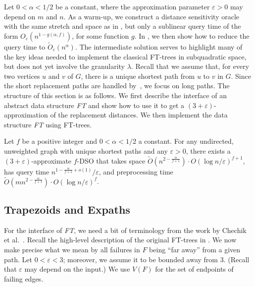 \documentclass{theoretics}
\newcommand*{\Otilde}{\widetilde{O}}
\newcommand{\eps}{\varepsilon}
\begin{document}
Let $0 < \alpha < 1/2$ be a constant,
where the approximation parameter $\varepsilon > 0$ may depend on $m$ and $n$.
As a warm-up, we construct a
distance sensitivity oracle with the same stretch and space as in ,
but only a sublinear query time of the form $O_{\varepsilon}(n^{1-g(\alpha,f)})$,
for some function $g$.
In , we then show how to reduce the query time to $\Otilde_\eps(n^\alpha)$.
The intermediate solution serves to highlight many of the key ideas 
needed to implement the classical FT-trees in subquadratic space,
but does not yet involve the granularity $\lambda$. 
Recall that we assume that, for every two vertices $u$ and $v$ of $G$,
there is a unique shortest path from $u$ to $v$ in $G$.
Since the short replacement paths are handled by~,
we focus on long paths.
The structure of this section is as follows.
We first describe the interface of an abstract data structure \emph{FT}
and show how to use it to get a $(3{+}\eps)$-approximation of the replacement distances.
We then implement the data structure \emph{FT} using FT-trees.

\begin{lemma}
\label{lem:long_paths_sublinear_query}
  Let $f$ be a positive integer and $0 < \alpha < 1/2$ a constant.
  For any  undirected, unweighted graph
  with unique shortest paths
  and any $\eps > 0$,
  there exists a $(3{+}\eps)$-approximate \mbox{$f$-DSO}
  that takes space $\Otilde(n^{2-\frac{\alpha}{f+1}}) \cdot O(\log n/\varepsilon)^{f+1}$,
  has query time $n^{1-\frac{\alpha}{f+1}+o(1)}/\varepsilon$,
  and preprocessing time 
  $\Otilde(mn^{2-\frac{\alpha}{f+1}}) \cdot O(\log n/\varepsilon)^{f}$.
\end{lemma}


\subsection{Trapezoids and Expaths}
\label{subsec:sublinear_trapezoids}

For the interface of \emph{FT}, 
we need a bit of terminology from the work by Chechik et al.~\cite{ChCoFiKa17}.
Recall the high-level description of the original FT-trees in .
We now make precise what we mean by all failures in $F$ being ``far away'' from a given path.
Let $0< \eps < 3$; moreover, we assume it to be bounded away from $3$.
(Recall that $\varepsilon$ may depend on the input.)
We use $V(F)$ for the set of endpoints of failing edges.
\end{document}
